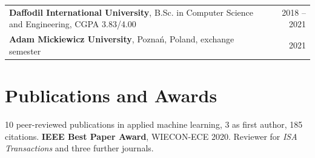 \documentclass[letterpaper,10.5pt]{article}
\begin{document}
\begin{tabularx}{\textwidth}{@{}Xr@{}}
\textbf{Daffodil International University}, B.Sc. in Computer Science and Engineering, CGPA 3.83/4.00 & 2018 -- 2021 \\[2pt]
\textbf{Adam Mickiewicz University}, Pozna\'n, Poland, exchange semester & 2021 \\
\end{tabularx}

\section{Publications and Awards}

10 peer-reviewed publications in applied machine learning, 3 as first author, 185 citations. \textbf{IEEE Best Paper Award}, WIECON-ECE 2020. Reviewer for \textit{ISA Transactions} and three further journals.
\end{document}

